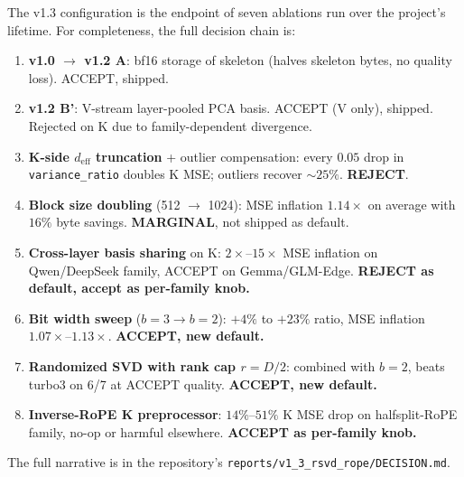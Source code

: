 \documentclass[11pt,a4paper]{article}
\theoremstyle{definition}
\theoremstyle{plain}
\begin{document}
The v1.3 configuration is the endpoint of seven ablations run over the project's lifetime. For completeness, the full decision chain is:
\begin{enumerate}[leftmargin=*]
  \item \textbf{v1.0 $\to$ v1.2 A}: bf16 storage of skeleton (halves skeleton bytes, no quality loss). ACCEPT, shipped.
  \item \textbf{v1.2 B'}: V-stream layer-pooled PCA basis. ACCEPT (V only), shipped. Rejected on K due to family-dependent divergence.
  \item \textbf{K-side $d_{\text{eff}}$ truncation} + outlier compensation: every $0.05$ drop in \texttt{variance\_ratio} doubles K MSE; outliers recover $\sim 25\%$. \textbf{REJECT}.
  \item \textbf{Block size doubling} (512 $\to$ 1024): MSE inflation $1.14\times$ on average with $16\%$ byte savings. \textbf{MARGINAL}, not shipped as default.
  \item \textbf{Cross-layer basis sharing} on K: $2\times$--$15\times$ MSE inflation on Qwen/DeepSeek family, ACCEPT on Gemma/GLM-Edge. \textbf{REJECT as default, accept as per-family knob.}
  \item \textbf{Bit width sweep} ($b=3 \to b=2$): $+4\%$ to $+23\%$ ratio, MSE inflation $1.07\times$--$1.13\times$. \textbf{ACCEPT, new default.}
  \item \textbf{Randomized SVD with rank cap $r = D/2$}: combined with $b=2$, beats turbo3 on 6/7 at ACCEPT quality. \textbf{ACCEPT, new default.}
  \item \textbf{Inverse-RoPE K preprocessor}: $14\%$--$51\%$ K MSE drop on halfsplit-RoPE family, no-op or harmful elsewhere. \textbf{ACCEPT as per-family knob.}
\end{enumerate}
The full narrative is in the repository's \verb|reports/v1_3_rsvd_rope/DECISION.md|.
\end{document}
